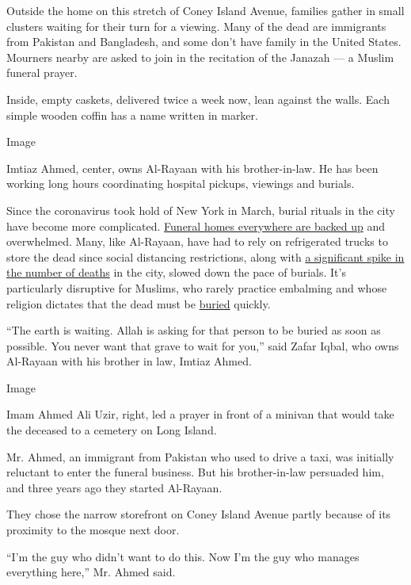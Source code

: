 Outside the home on this stretch of Coney Island Avenue, families gather
in small clusters waiting for their turn for a viewing. Many of the dead
are immigrants from Pakistan and Bangladesh, and some don't have family
in the United States. Mourners nearby are asked to join in the
recitation of the Janazah --- a Muslim funeral prayer.

Inside, empty caskets, delivered twice a week now, lean against the
walls. Each simple wooden coffin has a name written in marker.

Image

Imtiaz Ahmed, center, owns Al-Rayaan with his brother-in-law. He has
been working long hours coordinating hospital pickups, viewings and
burials.

Since the coronavirus took hold of New York in March, burial rituals in
the city have become more complicated.
\href{https://www.nytimes.com/2020/04/30/nyregion/coronavirus-nyc-funeral-home-morgue-bodies.html}{Funeral
homes everywhere are backed up} and overwhelmed. Many, like Al-Rayaan,
have had to rely on refrigerated trucks to store the dead since social
distancing restrictions, along with
\href{https://www.nytimes.com/interactive/2020/04/27/upshot/coronavirus-deaths-new-york-city.html}{a
significant spike in the number of deaths} in the city, slowed down the
pace of burials. It's particularly disruptive for Muslims, who rarely
practice embalming and whose religion dictates that the dead must be
\href{https://www.nytimes.com/2020/07/10/world/africa/coronavirus-capetown-south-africa.html}{buried}
quickly.

``The earth is waiting. Allah is asking for that person to be buried as
soon as possible. You never want that grave to wait for you,'' said
Zafar Iqbal, who owns Al-Rayaan with his brother in law, Imtiaz Ahmed.

Image

Imam Ahmed Ali Uzir, right, led a prayer in front of a minivan that
would take the deceased to a cemetery on Long Island.

Mr. Ahmed, an immigrant from Pakistan who used to drive a taxi, was
initially reluctant to enter the funeral business. But his
brother-in-law persuaded him, and three years ago they started
Al-Rayaan.

They chose the narrow storefront on Coney Island Avenue partly because
of its proximity to the mosque next door.

``I'm the guy who didn't want to do this. Now I'm the guy who manages
everything here,'' Mr. Ahmed said.

